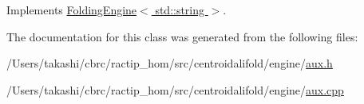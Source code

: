 Implements \hyperlink{class_folding_engine_a314c78e5fe35d5a1b5f441604c58e8f1}{Folding\+Engine$<$ std\+::string $>$}.



The documentation for this class was generated from the following files\+:\begin{DoxyCompactItemize}
\item 
/\+Users/takashi/cbrc/ractip\+\_\+hom/src/centroidalifold/engine/\hyperlink{aux_8h}{aux.\+h}\item 
/\+Users/takashi/cbrc/ractip\+\_\+hom/src/centroidalifold/engine/\hyperlink{aux_8cpp}{aux.\+cpp}\end{DoxyCompactItemize}
